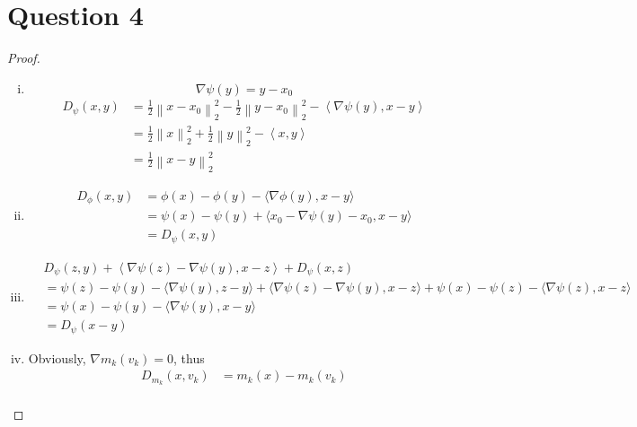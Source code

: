 \documentclass{article}
\begin{document}
\section*{Question 4}
    \begin{proof}
        \indent
        \begin{enumerate}[(i)]
            \item $$\nabla \psi(y)=y-x_0$$
            \begin{align*}
                D_{\psi}(x,y)
                &=\frac{1}{2}\left\lVert x-x_0 \right \rVert_2^2
                    -\frac{1}{2}\left\lVert y-x_0 \right \rVert_2^2
                    -\left\langle \nabla \psi(y), x-y \right\rangle\\
                &=\frac{1}{2}\left\lVert x \right \rVert_2^2
                    +\frac{1}{2}\left\lVert y \right \rVert_2^2
                    -\left\langle x,y \right\rangle\\
                &=\frac{1}{2}\left\lVert x-y \right \rVert_2^2
            \end{align*}
            \item
            \begin{align*}
                D_{\phi}(x,y)
                    &=\phi(x)-\phi(y)-\langle \nabla \phi(y),x-y\rangle\\
                    &=\psi(x)-\psi(y)+\langle x_0-\nabla\psi(y)-x_0 ,x-y \rangle\\
                    &=D_{\psi}(x,y)
            \end{align*}
            \item \begin{align*}
                &D_{\psi}(z,y)
                    +\left\langle \nabla\psi(z)-\nabla\psi(y), x-z \right\rangle
                    +D_{\psi}(x,z)\\
                &=\psi(z)-\psi(y)-\langle \nabla \psi(y),z-y\rangle
                    +\langle \nabla\psi(z) - \nabla\psi(y), x-z\rangle
                    +\psi(x)-\psi(z)-\langle \nabla \psi(z), x-z\rangle\\
                &=\psi(x)-\psi(y)-\langle \nabla\psi(y),x-y\rangle\\
                &=D_{\psi}(x-y)
            \end{align*}
            \item Obviously, $\nabla m_k(v_k)=0$, thus
            \begin{align*}
                D_{m_k}(x,v_k)&=m_k(x)-m_k(v_k)\\

\end{align*}
\end{enumerate}
\end{proof}
\end{document}
